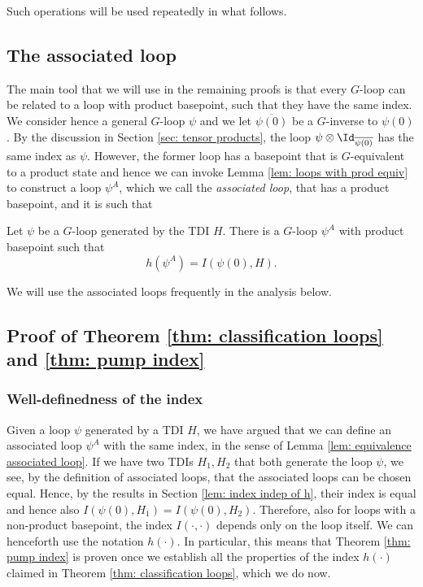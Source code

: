 Such operations will be used repeatedly in what follows.


\subsection{The associated loop}
The main tool that we will use in the remaining proofs is that every $G$-loop can be related to a loop with product basepoint, such that they have the same index.
We consider hence a general $G$-loop $\psi$ and we let $\overline{\psi(0)}$ be a $G$-inverse to $\psi(0)$. By the discussion in Section \ref{sec: tensor products}, the loop $\psi\otimes \Id_{\overline{\psi(0)}}$ has the same index as $\psi$. However, the former loop has a basepoint that is $G$-equivalent to a product state and hence we can invoke Lemma \ref{lem: loops with prod equiv} to construct a loop $\psi^A$, which we call the \emph{associated loop}, that has a product basepoint, and it is such that 

\begin{lemma} \label{lem: equivalence associated loop}  
	Let $\psi$ be a $G$-loop generated by the TDI $H$. There is a $G$-loop $\psi^A$ with product basepoint such that
	$$
	h(\psi^A)=I(\psi(0),H).
	$$
\end{lemma}


We will use the associated loops frequently in the analysis below.

\subsection{Proof of Theorem \ref{thm: classification loops} and \ref{thm: pump index}}


\subsubsection{Well-definedness of the index}

Given a loop $\psi$ generated by a TDI $H$, we have argued that we can define an associated loop $\psi^A$ with the same index, in the sense of Lemma \ref{lem: equivalence associated loop}.
If we have two TDIs $H_1,H_2$ that both generate the loop $\psi$, we see, by the definition of associated loops, that the associated loops can be chosen equal. Hence, by the results in Section \ref{lem: index indep of h}, their index is equal and hence also 
$ I(\psi(0),H_1)= I(\psi(0),H_2) $. Therefore, also for loops with a non-product basepoint, the index $I(\cdot,\cdot)$ depends only on the loop itself. 
We can henceforth use the notation $h(\cdot)$. In particular, this means that Theorem \ref{thm: pump index} is proven once we establish all the properties of the index $h(\cdot)$ claimed in Theorem \ref{thm: classification loops}, which we do now.




